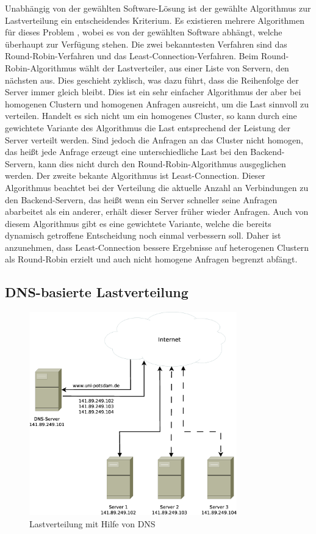 \documentclass[a4paper, 12pt, BCOR10mm, DIV12, toc=bibliography, toc=listof, german]{scrbook}
\begin{document}
			Unabhängig von der gewählten Software-Lösung ist der gewählte Algorithmus zur Lastverteilung
			ein entscheidendes Kriterium. Es existieren mehrere Algorithmen für dieses Problem
			\cite{zinke2007}, wobei es von der gewählten Software abhängt, welche überhaupt zur Verfügung
			stehen.  Die zwei bekanntesten Verfahren sind das Round-Robin-Verfahren und das
			Least-Connection-Verfahren. Beim Round-Robin-Algorithmus wählt der Lastverteiler, aus einer
			Liste von Servern, den nächsten aus. Dies geschieht zyklisch, was dazu führt, dass die
			Reihenfolge der Server immer gleich bleibt. Dies ist ein sehr einfacher Algorithmus der aber
			bei homogenen Clustern und homogenen Anfragen ausreicht, um die Last sinnvoll zu verteilen.
			Handelt es sich nicht um ein homogenes Cluster, so kann durch eine gewichtete Variante des
			Algorithmus die Last entsprechend der Leistung der Server verteilt werden. Sind jedoch die
			Anfragen an das Cluster nicht homogen, das heißt jede Anfrage erzeugt eine unterschiedliche
			Last bei den Backend-Servern, kann dies nicht durch den Round-Robin-Algorithmus ausgeglichen
			werden. Der zweite bekante Algorithmus ist Least-Connection. Dieser Algorithmus beachtet bei
			der Verteilung die aktuelle Anzahl an Verbindungen zu den Backend-Servern, das heißt wenn ein
			Server schneller seine Anfragen abarbeitet als ein anderer, erhält dieser Server früher wieder
			Anfragen. Auch von diesem Algorithmus gibt es eine gewichtete Variante, welche die bereits
			dynamisch getroffene Entscheidung noch einmal verbessern soll. Daher ist anzunehmen, dass
			Least-Connection bessere Ergebnisse auf heterogenen Clustern als Round-Robin erzielt und auch
			nicht homogene Anfragen begrenzt abfängt.


			\subsection{DNS-basierte Lastverteilung} %
			\label{sub:dns-lastverteilung}

			\begin{figure}
				\centering
				\includegraphics[width=9cm]{images/dns-loadbalancer}
				\caption{Lastverteilung mit Hilfe von DNS}
				\label{fig:lastverteilung-dns}
			\end{figure}
\end{document}
